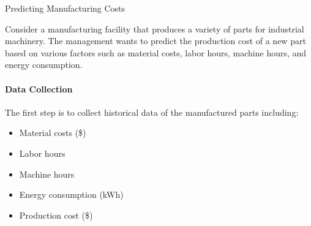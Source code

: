 \begin{examplewithcode}{Predicting Manufacturing Costs}{}

Consider a manufacturing facility that produces a variety of parts for industrial machinery. The management wants to predict the production cost of a new part based on various factors such as material costs, labor hours, machine hours, and energy consumption.

\paragraph{Data Collection}

The first step is to collect historical data of the manufactured parts including:

\begin{itemize}
  \item Material costs (\$)
  \item Labor hours
  \item Machine hours
  \item Energy consumption (kWh)
  \item Production cost (\$)
\end{itemize}


\end{examplewithcode}
